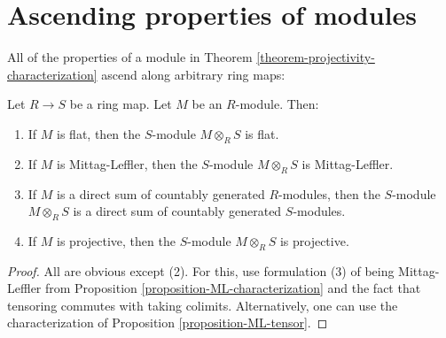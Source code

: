 \section{Ascending properties of modules}
\label{section-ascent}

\noindent
All of the properties of a module in Theorem
\ref{theorem-projectivity-characterization} ascend along arbitrary ring maps:

\begin{lemma}
\label{lemma-ascend-properties-modules}
Let $R \to S$ be a ring map.  Let $M$ be an $R$-module.  Then:
\begin{enumerate}
\item If $M$ is flat, then the $S$-module $M \otimes_R S$ is flat.
\item If $M$ is Mittag-Leffler, then the $S$-module $M \otimes_R S$ is
Mittag-Leffler.
\item If $M$ is a direct sum of countably generated $R$-modules, then the
$S$-module $M \otimes_R S$ is a direct sum of countably generated $S$-modules.
\item If $M$ is projective, then the $S$-module $M \otimes_R S$ is projective.
\end{enumerate}
\end{lemma}

\begin{proof}
All are obvious except (2).  For this, use formulation (3) of being
Mittag-Leffler from Proposition \ref{proposition-ML-characterization} and the
fact that tensoring commutes with taking colimits. Alternatively, one can
use the characterization of Proposition \ref{proposition-ML-tensor}.
\end{proof}



